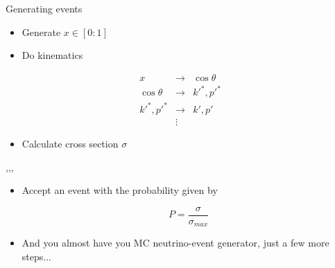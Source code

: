 \begin{slide}{Generating events}
\null\vfill

  \twocolumn
  {
    \begin{itemize}
      \item Generate $x \in [0:1]$
      \item Do kinematics
    \end{itemize}
      \begin{eqnarray*}
	x & \rightarrow & \cos\theta \\
	\cos\theta & \rightarrow & k'^*, p'^* \\
	k'^*, p'^* & \rightarrow & k', p' \\
	& \vdots &
      \end{eqnarray*}
    \begin{itemize}
      \item Calculate cross section $\sigma$
    \end{itemize}
  }
  {
    \sep\sep\sep
    
  }
  
  \begin{itemize}
  
    \item Accept an event with the probability given by
    
    $$P = \frac{\sigma}{\sigma_{max}}$$
    \vspace{-15pt}
    \item And you almost have you MC neutrino-event generator, just a few more steps...
  \end{itemize}

\vfill\null
\end{slide}

